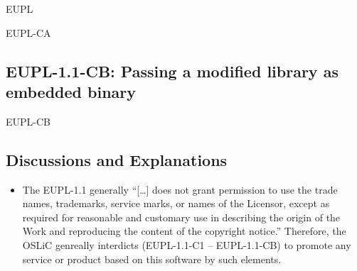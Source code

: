 \begin{license}{EUPL}
\begin{lsuc}{EUPL-CA}
\end{lsuc}

\subsection{EUPL-1.1-CB: Passing a modified library as embedded binary}
\begin{lsuc}{EUPL-CB}



  \begin{lsucrequires}
    \lsucmandatory{\keepLicensingElements \addWhenCompiling}
    \lsucmandatory{\giveLicense}\passingFilesCorrectly
    \lsucmandatory{\addModificationTextFile}
    \lsucmandatory{\makeAllSourcesAvailable}
    \lsucmandatory{\mentionRepositoryInDocumentation}
    \lsucmandatory{\arrangeBinaryModifications}
    \lsucmandatory{\applyCopyleftToBinaries}
    \lsucoptional{\markAllEmbeddedModifications}
    \lsucoptional{\addToYourCopyrightNotice}
  \end{lsucrequires}

  \begin{lsucprohibits}
    \lsucitem{\noTrademarks}
  \end{lsucprohibits}

\end{lsuc}

\subsection{Discussions and Explanations}
\begin{itemize}
  
\item The EUPL-1.1 generally \enquote{[\ldots] does not grant permission to use
  the trade names, trademarks, service marks, or names of the Licensor, except
  as required for reasonable and customary use in describing the origin of the
  Work and reproducing the content of the copyright notice.} 
  Therefore, the OSLiC genreally interdicts (EUPL-1.1-C1 -- EUPL-1.1-CB) to promote any
  service or product based on this software by such elements. 


\end{itemize}
\end{license}
